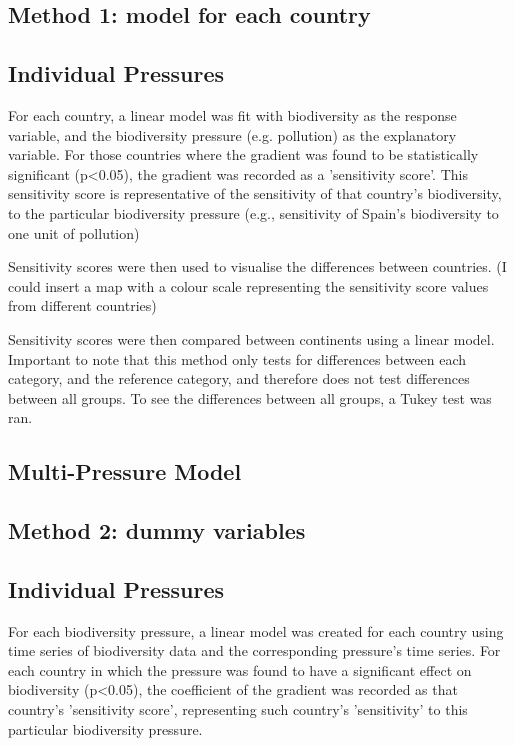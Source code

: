 \documentclass[11pt, a4paper, titlepage]{article}
\begin{document}
	\subsection*{Method 1: model for each country}

	\subsection*{Individual Pressures}
	
	For each country, a linear model was fit with biodiversity as the response variable, and the biodiversity pressure (e.g. pollution) as the explanatory variable. For those countries where the gradient was found to be statistically significant (p<0.05), the gradient was recorded as a 'sensitivity score'. This sensitivity score is representative of the sensitivity of that country's biodiversity, to the particular biodiversity pressure (e.g., sensitivity of Spain's biodiversity to one unit of pollution) \newline
	
	Sensitivity scores were then used to visualise the differences between countries. (I could insert a map with a colour scale representing the sensitivity score values from different countries) \newline
	
	Sensitivity scores were then compared between continents using a linear model. Important to note that this method only tests for differences between each category, and the reference category, and therefore does not test differences between all groups. To see the differences between all groups, a Tukey test was ran.  \newline
	
	
	\subsection*{Multi-Pressure Model}
	
	\subsection*{Method 2: dummy variables}
	
	\subsection*{Individual Pressures}
	For each biodiversity pressure, a linear model was created for each country using time series of biodiversity data and the corresponding pressure's time series. For each country in which the pressure was found to have a significant effect on biodiversity (p<0.05), the coefficient of the gradient was recorded as that country's 'sensitivity score', representing such country's 'sensitivity' to this particular biodiversity pressure. \newline
\end{document}

